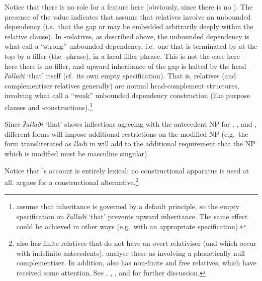 \documentclass[output=paper
 	        ,biblatex
                ,babelshorthands
                ,newtxmath
                ,draftmode
                ,colorlinks, citecolor=brown
]{langscibook}
\begin{document}
Notice that there is no role for a  feature here (obviously, since there is no
).  The presence of the  value indicates that
\citeauthor{Alqurashi:Borsley:12} assume that  relatives involve an unbounded
dependency (i.e.\ that the gap or  may be embedded arbitrarily
deeply within the relative clause). In -relatives, as described above, the
unbounded dependency is what \citet[155]{Pollard:Sag:94} call a ``strong'' unbounded
dependency,  i.e.\ one that is terminated by at the top by
a filler (the -phrase), in a head-filler phrase. This is not the case here ---
here there is no filler, and upward inheritance of the gap is halted by the head
\emph{ʔallaði} `that' itself (cf.\ its own empty  specification). That is,
 relatives (and complementiser relatives generally) are normal head-complement
structures, involving what \citet[]{Pollard:Sag:94} call a ``weak''
unbounded dependency  construction (like 
purpose clauses and -constructions).\footnote{\citet[42]{Alqurashi:Borsley:12}
  assume that  inheritance is governed by a default principle, so the
  empty  specification on \emph{ʔallaði} `that' prevents upward
  inheritance. The same effect could be achieved in other ways (e.g.\ with an appropriate 
  specification). }


Since \emph{ʔallaði} `that' shows inflections agreeing with the antecedent NP for
, , and , different forms will impose
additional restrictions on the modified NP (e.g.\ the form transliterated as
\emph{llaði} in  will add to  the additional requirement that
the NP which is modified must be masculine singular).

Notice that \citeauthor{Alqurashi:Borsley:12}'s account is entirely lexical: no
constructional apparatus is used at all. \citet{Hahn:12} argues for a constructional
alternative.\footnote{ also has finite relatives that do not have an overt
  relativiser (and which occur with indefinite
  antecedents). \citeauthor{Alqurashi:Borsley:12} analyse these as involving a
  phonetically null complementiser. In addition,  also has non-finite and free
  relatives, which have received some attention. See \citet{Melnik:06},
  \citet{Haddar:Boukedi:09,Zalila:Haddar:11}, \citet{Hahn:12}, and \citet{Crysmann:Reintges:14}
  for further discussion.}
\end{document}

